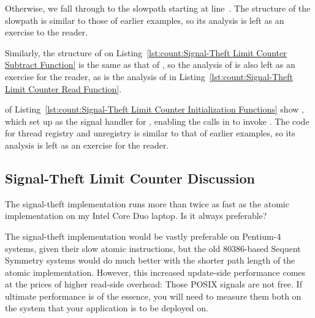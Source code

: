 \begin{listing}[tbp]

\caption{Signal-Theft Limit Counter Read Function}
\label{lst:count:Signal-Theft Limit Counter Read Function}
\end{listing}

\begin{fcvref}
Otherwise, we fall through to the slowpath starting at line~.
The structure of the slowpath is similar to those of earlier examples,
so its analysis is left as an exercise to the reader.
\end{fcvref}
Similarly, the structure of  on
Listing~\ref{lst:count:Signal-Theft Limit Counter Subtract Function}
is the same
as that of , so the analysis of  is also
left as an exercise for the reader, as is the analysis of
 in
Listing~\ref{lst:count:Signal-Theft Limit Counter Read Function}.

\begin{listing}[tbp]

\caption{Signal-Theft Limit Counter Initialization Functions}
\label{lst:count:Signal-Theft Limit Counter Initialization Functions}
\end{listing}

\begin{fcvref}
 of
Listing~\ref{lst:count:Signal-Theft Limit Counter Initialization Functions}
show , which set up 
as the signal handler for ,
enabling the  calls in 
to invoke .
The code for thread registry and unregistry is similar to that of
earlier examples, so its analysis is left as an exercise for the
reader.
\end{fcvref}

\subsection{Signal-Theft Limit Counter Discussion}

The signal-theft implementation runs more than twice as fast as the
atomic implementation on my Intel Core Duo laptop.
Is it always preferable?

The signal-theft implementation would be vastly preferable on Pentium-4
systems, given their slow atomic instructions, but the old 80386-based
Sequent Symmetry systems would do much better with the shorter path
length of the atomic implementation.
However, this increased update-side performance comes at the
prices of higher read-side overhead: Those POSIX signals are not free.
If ultimate performance is of the essence, you will need to measure
them both on the system that your application is to be deployed on.

